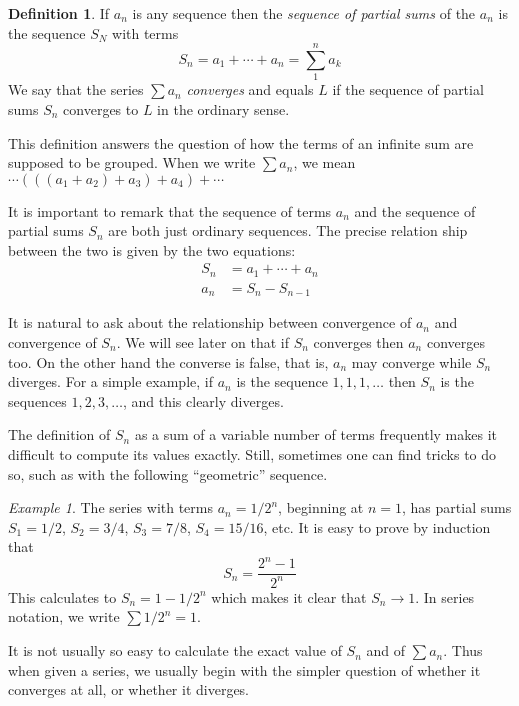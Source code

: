 \documentclass[11pt,oneside]{amsbook}
\theoremstyle{definition}
\theoremstyle{plain}
\theoremstyle{definition}
\newtheorem{definition}[theorem]{Definition}
\theoremstyle{remark}
\newtheorem{example}[theorem]{Example}
\numberwithin{equation}{section}
\numberwithin{figure}{section}
\begin{document}
\begin{definition}
  If $a_n$ is any sequence then the \emph{sequence of partial sums} of the $a_n$ is the sequence $S_N$ with terms
  \[S_n=a_1+\cdots+a_n=\sum_1^na_k
  \]
  We say that the series $\sum a_n$ \emph{converges} and equals $L$ if the sequence of partial sums $S_n$ converges to $L$ in the ordinary sense.
\end{definition}

This definition answers the question of how the terms of an infinite sum are supposed to be grouped. When we write $\sum a_n$, we mean $\cdots(((a_1+a_2)+a_3)+a_4)+\cdots$

It is important to remark that the sequence of terms $a_n$ and the sequence of partial sums $S_n$ are both just ordinary sequences. The precise relation ship between the two is given by the two equations:
\begin{align*}
  S_n&=a_1+\cdots+a_n\\
  a_n&=S_n-S_{n-1}
\end{align*}

It is natural to ask about the relationship between convergence of $a_n$ and convergence of $S_n$. We will see later on that if $S_n$ converges then $a_n$ converges too. On the other hand the converse is false, that is, $a_n$ may converge while $S_n$ diverges. For a simple example, if $a_n$ is the sequence $1,1,1,\ldots$ then $S_n$ is the sequences $1,2,3,\ldots$, and this clearly diverges.

The definition of $S_n$ as a sum of a variable number of terms frequently makes it difficult to compute its values exactly. Still, sometimes one can find tricks to do so, such as with the following ``geometric'' sequence.

\begin{example}
  \label{ex:geometric}
  The series with terms $a_n=1/2^n$, beginning at $n=1$, has partial sums $S_1=1/2$, $S_2=3/4$, $S_3=7/8$, $S_4=15/16$, etc. It is easy to prove by induction that
  \[S_n=\frac{2^n-1}{2^n}
  \]
  This calculates to $S_n=1-1/2^n$ which makes it clear that $S_n\to1$. In series notation, we write $\sum1/2^n=1$.
\end{example}

It is not usually so easy to calculate the exact value of $S_n$ and of $\sum a_n$. Thus when given a series, we usually begin with the simpler question of whether it converges at all, or whether it diverges.
\end{document}
